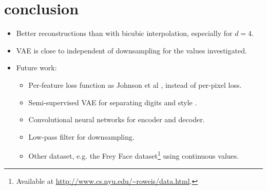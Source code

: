 \section{conclusion}
\label{sec:conclusion}

\begin{itemize}
	\item Better reconstructions than with bicubic interpolation, especially for $d = 4$.
	\item VAE is close to independent of downsampling for the values investigated.
	\item Future work:
	\begin{itemize}
		\item Per-feature loss function as Johnson et al \cite{Johnson16}, instead of per-pixel loss.
		\item Semi-supervised VAE for separating digits and style \cite{Kingma2014}.
		\item Convolutional neural networks for encoder and decoder.
		\item Low-pass filter for downsampling.
		\item Other dataset, e.g. the Frey Face dataset\footnote{Available at \url{http://www.cs.nyu.edu/~roweis/data.html}.} using continuous values. 
	\end{itemize}
\end{itemize}
